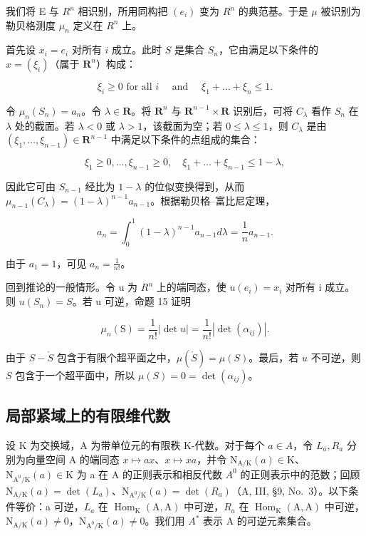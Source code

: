我们将 E 与 \(R^{n}\) 相识别，所用同构把 \((e_{i})\) 变为 \(R^{n}\) 的典范基。于是 \(\mu\) 被识别为勒贝格测度 \(\mu_{n}\) 定义在 \(R^{n}\) 上。

首先设 \(x_{i} = e_{i}\) 对所有 \(i\) 成立。此时 \(S\) 是集合 \(S_{n}\)，它由满足以下条件的 \(x = (\xi_{i})\)（属于 \(\mathbf{R}^n\)）构成：

\[
\xi_ {i} \geqslant 0 \text {   for   all   } i \quad \text { and } \quad \xi_ {1} + \dots + \xi_ {n} \leqslant 1.
\]

令 \(\mu_n(S_n) = a_n\)。令 \(\lambda \in \mathbf{R}\)。将 \(\mathbf{R}^n\) 与 \(\mathbf{R}^{n-1} \times \mathbf{R}\) 识别后，可将 \(C_\lambda\) 看作 \(S_n\) 在 \(\lambda\) 处的截面。若 \(\lambda < 0\) 或 \(\lambda > 1\)，该截面为空；若 \(0 \leqslant \lambda \leqslant 1\)，则 \(C_\lambda\) 是由 \((\xi_1, \ldots, \xi_{n-1}) \in \mathbf{R}^{n-1}\) 中满足以下条件的点组成的集合：

\[
\xi_ {1} \geqslant 0, \dots , \xi_ {n - 1} \geqslant 0, \quad \xi_ {1} + \dots + \xi_ {n - 1} \leqslant 1 - \lambda ,
\]

因此它可由 \(S_{n-1}\) 经比为 \(1-\lambda\) 的位似变换得到，从而 \(\mu_{n-1}(C_{\lambda})=(1-\lambda)^{n-1}a_{n-1}\)。根据勒贝格--富比尼定理，

\[
a _ {n} = \int_ {0} ^ {1} (1 - \lambda) ^ {n - 1} a _ {n - 1} d \lambda = \frac {1}{n} a _ {n - 1}.
\]

由于 \(a_1 = 1\)，可见 \(a_n = \frac{1}{n!}\)。

回到推论的一般情形。令 u 为 \(R^{n}\) 上的端同态，使 \(u(e_{i}) = x_{i}\) 对所有 i 成立。则 \(u(S_{n}) = S\)。若 u 可逆，命题 15 证明

\[
\mu_ {n} (\mathrm{S}) = \frac {1}{n !} | \det u | = \frac {1}{n !} | \det (\alpha_ {i j}) |.
\]

由于 \(S - \mathring{S}\) 包含于有限个超平面之中，\(\mu(\mathring{S}) = \mu(S)\)。最后，若 \(u\) 不可逆，则 \(S\) 包含于一个超平面中，所以 \(\mu(S) = 0 = \det(\alpha_{ij})\)。

\subsection{局部紧域上的有限维代数}

设 K 为交换域，A 为带单位元的有限秩 K-代数。对于每个 \(a \in A\)，令 \(L_{a}, R_{a}\) 分别为向量空间 A 的端同态 \(x \mapsto ax\)、\(x \mapsto xa\)，并令 \(\mathrm{N}_{\mathrm{A}/\mathrm{K}}(a) \in \mathrm{K}\)、\(\mathrm{N}_{\mathrm{A}^{0}/\mathrm{K}}(a) \in \mathrm{K}\) 为 a 在 A 的正则表示和相反代数 \(A^{0}\) 的正则表示中的范数；回顾 \(\mathrm{N}_{\mathrm{A}/\mathrm{K}}(a) = \det(L_{a})\)、\(\mathrm{N}_{\mathrm{A}^{0}/\mathrm{K}}(a) = \det(R_{a})\)（A, III, §9, No.~3）。以下条件等价：a 可逆，\(L_{a}\) 在 \(\operatorname{Hom}_{\mathrm{K}}(\mathrm{A}, \mathrm{A})\) 中可逆，\(R_{a}\) 在 \(\operatorname{Hom}_{\mathrm{K}}(\mathrm{A}, \mathrm{A})\) 中可逆，\(\mathrm{N}_{\mathrm{A}/\mathrm{K}}(a) \neq 0\)，\(\mathrm{N}_{\mathrm{A}^{0}/\mathrm{K}}(a) \neq 0\)。我们用 \(A^{*}\) 表示 A 的可逆元素集合。

